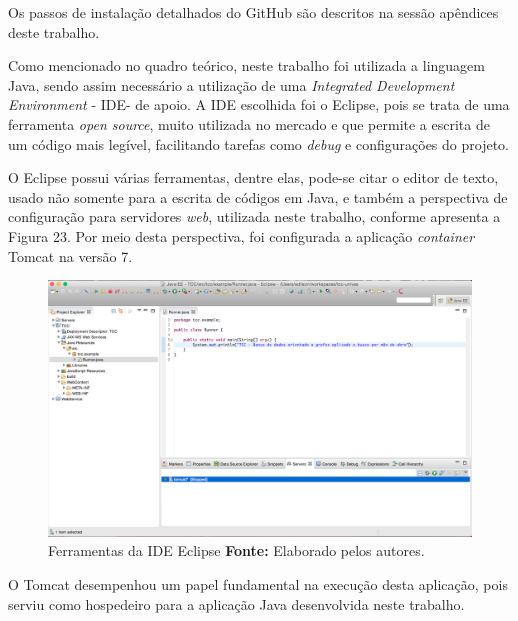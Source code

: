 \par Os passos de instalação detalhados do GitHub são descritos na sessão apêndices deste trabalho.

\par Como mencionado no quadro teórico, neste trabalho foi utilizada a linguagem Java, sendo assim necessário a utilização de uma \textit{Integrated Development Environment} - IDE\footnotemark[32] - de apoio. A IDE escolhida foi o Eclipse, pois se trata de uma ferramenta \textit{open source}, muito utilizada no mercado e que permite a escrita de um código mais legível, facilitando tarefas como \textit{debug} e configurações do projeto.


\par O Eclipse possui várias ferramentas, dentre elas, pode-se citar o editor de texto, usado não somente para a escrita de códigos em Java, e também a perspectiva de configuração para servidores \textit{web}, utilizada neste trabalho, conforme apresenta a Figura 23. Por meio desta perspectiva, foi configurada a aplicação \textit{container} Tomcat na versão 7.

\newpage
\begin{figure}[h!]
	\centerline{\includegraphics[scale=0.35]{./imagens/eclipse-editor-texto.png}}
	\caption[Ferramentas da IDE Eclipse]
	{Ferramentas da IDE Eclipse \textbf{Fonte:} Elaborado pelos autores.}
	\label{fig:exemplo1}
\end{figure}

\par O Tomcat desempenhou um papel fundamental na execução desta aplicação, pois serviu como hospedeiro para a aplicação Java desenvolvida neste trabalho. 

